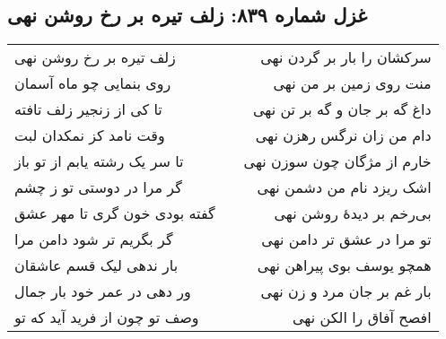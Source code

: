 \begin{center}
\section*{غزل شماره ۸۳۹: زلف تیره بر رخ روشن نهی}
\label{sec:839}
\begin{longtable}{l p{0.5cm} r}
زلف تیره بر رخ روشن نهی
&&
سرکشان را بار بر گردن نهی
\\
روی بنمایی چو ماه آسمان
&&
منت روی زمین بر من نهی
\\
تا کی از زنجیر زلف تافته
&&
داغ گه بر جان و گه بر تن نهی
\\
وقت نامد کز نمکدان لبت
&&
دام من زان نرگس رهزن نهی
\\
تا سر یک رشته یابم از تو باز
&&
خارم از مژگان چون سوزن نهی
\\
گر مرا در دوستی تو ز چشم
&&
اشک ریزد نام من دشمن نهی
\\
گفته بودی خون گری تا مهر عشق
&&
بی‌رخم بر دیدهٔ روشن نهی
\\
گر بگریم تر شود دامن مرا
&&
تو مرا در عشق تر دامن نهی
\\
بار ندهی لیک قسم عاشقان
&&
همچو یوسف بوی پیراهن نهی
\\
ور دهی در عمر خود بار جمال
&&
بار غم بر جان مرد و زن نهی
\\
وصف تو چون از فرید آید که تو
&&
افصح آفاق را الکن نهی
\\
\end{longtable}
\end{center}
